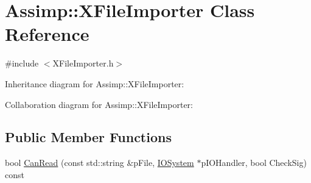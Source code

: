 \hypertarget{class_assimp_1_1_x_file_importer}{\section{Assimp\+:\+:X\+File\+Importer Class Reference}
\label{class_assimp_1_1_x_file_importer}
}


{\ttfamily \#include $<$X\+File\+Importer.\+h$>$}



Inheritance diagram for Assimp\+:\+:X\+File\+Importer\+:


Collaboration diagram for Assimp\+:\+:X\+File\+Importer\+:
\subsection*{Public Member Functions}
\begin{DoxyCompactItemize}
\item 
bool \hyperlink{class_assimp_1_1_x_file_importer_a37ebcae63c19eed43727aef6c50776c2}{Can\+Read} (const std\+::string \&p\+File, \hyperlink{class_assimp_1_1_i_o_system}{I\+O\+System} $\ast$p\+I\+O\+Handler, bool Check\+Sig) const 
\end{DoxyCompactItemize}
